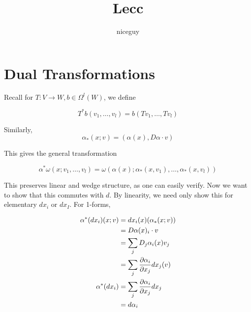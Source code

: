 \documentclass[12pt]{article}
\title{Lecc}
\author{niceguy}
\begin{document}
\maketitle

\section{Dual Transformations}

Recall for $T:V\rightarrow W, b \in \Omega^l(W)$, we define

$$T^*b(v_1,\dots,v_l) = b(Tv_1,\dots,Tv_l)$$

Similarly,
$$\alpha_*(x;v) = (\alpha(x),D\alpha\cdot v)$$

This gives the general transformation

$$\alpha^*\omega(x;v_1,\dots,v_l) = \omega(\alpha(x);\alpha_*(x,v_1),\dots,\alpha_*(x,v_l))$$

This preserves linear and wedge structure, as one can easily verify. Now we want to show that this commutes with $d$. By linearity, we need only show this for elementary $dx_i$ or $dx_I$. For 1-forms,

\begin{align*}
    \alpha^*(dx_i)(x;v) &= dx_i(x)(\alpha_*(x;v)) \\
                        &= D\alpha(x)_i\cdot v \\
                        &= \sum_j D_j\alpha_i(x)v_j \\
                        &= \sum_j \frac{\partial \alpha_i}{\partial x_j}dx_j(v) \\
    \alpha^*(dx_i) &= \sum_j \frac{\partial \alpha_i}{\partial x_j}dx_j \\
                   &= d\alpha_i
\end{align*}
\end{document}
